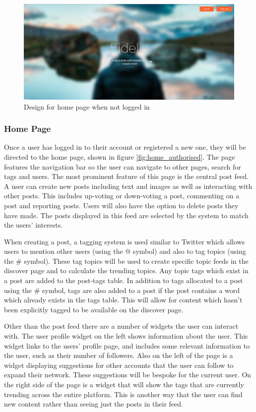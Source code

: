 \begin{figure}[H]
\centering
\includegraphics[width=\linewidth]{Images/Design/home_unauthorised}
\caption{Design for home page when not logged in}
\label{fig:home_unauthorised}
\end{figure}

\subsubsection{Home Page}
Once a user has logged in to their account or registered a new one, they will be directed to the home page, shown in figure \ref{fig:home_authorised}. The page features the navigation bar so the user can navigate to other pages, search for tags and users. The most prominent feature of this page is the central post feed. A user can create new posts including text and images as well as interacting with other posts. This includes up-voting or down-voting a post, commenting on a post and reporting posts. Users will also have the option to delete posts they have made. The posts displayed in this feed are selected by the system to match the users' interests.

When creating a post, a tagging system is used similar to Twitter which allows users to mention other users (using the @ symbol) and also to tag topics (using the \# symbol). These tag topics will be used to create specific topic feeds in the discover page and to calculate the trending topics. Any topic tags which exist in a post are added to the post-tags table. In addition to tags allocated to a post using the \# symbol, tags are also added to a post if the post contains a word which already exists in the tags table. This will allow for content which hasn't been explicitly tagged to be available on the discover page.

Other than the post feed there are a number of widgets the user can interact with. The user profile widget on the left shows information about the user. This widget links to the users' profile page, and includes some relevant information to the user, such as their number of followers. Also on the left of the page is a widget displaying suggestions for other accounts that the user can follow to expand their network. These suggestions will be bespoke for the current user. On the right side of the page is a widget that will show the tags that are currently trending across the entire platform. This is another way that the user can find new content rather than seeing just the posts in their feed.

